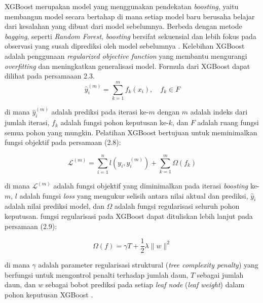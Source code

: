     
    XGBoost merupakan model yang menggunakan pendekatan \textit{boosting}, yaitu membangun model secara bertahap di mana setiap model baru berusaha belajar dari kesalahan yang dibuat dari model sebelumnya. Berbeda dengan metode \textit{bagging}, seperti \textit{Random Forest},\textit{ boosting} bersifat sekuensial dan lebih fokus pada observasi yang susah diprediksi oleh model sebelumnya \cite{Dong2020}. Kelebihan XGBoost adalah penggunaan \textit{regularized objective function} yang membantu mengurangi \textit{overfitting} dan meningkatkan generalisasi model. Formula dari XGBoost dapat dilihat pada persamaaan 2.3.
    \begin{equation}
    \hat{y}_i^{(m)} = \sum_{k=1}^{m} f_k(x_i), \quad f_k \in F
    \tag{2.7}
    \end{equation}
    
    di mana $\hat{y}_i^{(m)}$ adalah prediksi pada iterasi ke-$m$ dengan $m$ adalah indeks
    dari jumlah iterasi, $f_k$ adalah fungsi pohon keputusan ke-$k$, dan $F$ adalah
    ruang fungsi semua pohon yang mungkin. Pelatihan XGBoost bertujuan untuk
    meminimalkan fungsi objektif pada persamaan (2.8):
    
    \begin{equation}
    \mathcal{L}^{(m)} = \sum_{i=1}^{n} l(y_i, \hat{y}_i^{(m)}) + \sum_{k=1}^{m} \Omega(f_k)
    \tag{2.8}
    \end{equation}
    
    di mana $\mathcal{L}^{(m)}$ adalah fungsi objektif yang diminimalkan pada iterasi
    \textit{boosting} ke-$m$, $l$ adalah fungsi \textit{loss} yang mengukur selisih antara
    nilai aktual dan prediksi, $\hat{y}_i$ adalah nilai prediksi model, dan $\Omega$
    adalah fungsi regularisasi seluruh pohon keputusan. fungsi regularisasi pada XGBoost dapat dituliskan lebih lanjut pada
    persamaan (2.9):
    
    \begin{equation}
    \Omega(f) = \gamma T + \frac{1}{2}\lambda \|w\|^2
    \tag{2.9}
    \end{equation}
    
    di mana $\gamma$ adalah parameter regularisasi struktural
    (\textit{tree complexity penalty}) yang berfungsi untuk mengontrol penalti terhadap jumlah daun,
    $T$ sebagai jumlah daun, dan $w$ sebagai bobot prediksi pada setiap \textit{leaf node}
    (\textit{leaf weight}) dalam pohon keputusan XGBoost \cite{Chen2016}.
    
    
